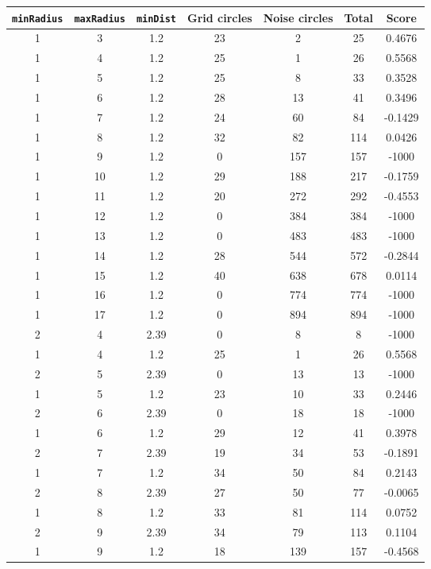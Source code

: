 \documentclass[letterpaper, 12pt]{article}
\begin{document}
\begin{longtable}{|c|c|c|c|c|c|c|}
\hline
\textbf{\texttt{minRadius}} & \textbf{\texttt{maxRadius}} & \textbf{\texttt{minDist}} & \textbf{Grid circles} & \textbf{Noise circles} & \textbf{Total} & \textbf{Score} \\
\hline
1 & 3 & 1.2 & 23 & 2 & 25 & 0.4676 \\
\hline
1 & 4 & 1.2 & 25 & 1 & 26 & 0.5568 \\
\hline
1 & 5 & 1.2 & 25 & 8 & 33 & 0.3528 \\
\hline
1 & 6 & 1.2 & 28 & 13 & 41 & 0.3496 \\
\hline
1 & 7 & 1.2 & 24 & 60 & 84 & -0.1429 \\
\hline
1 & 8 & 1.2 & 32 & 82 & 114 & 0.0426 \\
\hline
1 & 9 & 1.2 & 0 & 157 & 157 & -1000 \\
\hline
1 & 10 & 1.2 & 29 & 188 & 217 & -0.1759 \\
\hline
1 & 11 & 1.2 & 20 & 272 & 292 & -0.4553 \\
\hline
1 & 12 & 1.2 & 0 & 384 & 384 & -1000 \\
\hline
1 & 13 & 1.2 & 0 & 483 & 483 & -1000 \\
\hline
1 & 14 & 1.2 & 28 & 544 & 572 & -0.2844 \\
\hline
1 & 15 & 1.2 & 40 & 638 & 678 & 0.0114 \\
\hline
1 & 16 & 1.2 & 0 & 774 & 774 & -1000 \\
\hline
1 & 17 & 1.2 & 0 & 894 & 894 & -1000 \\
\hline
2 & 4 & 2.39 & 0 & 8 & 8 & -1000 \\
\hline
1 & 4 & 1.2 & 25 & 1 & 26 & 0.5568 \\
\hline
2 & 5 & 2.39 & 0 & 13 & 13 & -1000 \\
\hline
1 & 5 & 1.2 & 23 & 10 & 33 & 0.2446 \\
\hline
2 & 6 & 2.39 & 0 & 18 & 18 & -1000 \\
\hline
1 & 6 & 1.2 & 29 & 12 & 41 & 0.3978 \\
\hline
2 & 7 & 2.39 & 19 & 34 & 53 & -0.1891 \\
\hline
1 & 7 & 1.2 & 34 & 50 & 84 & 0.2143 \\
\hline
2 & 8 & 2.39 & 27 & 50 & 77 & -0.0065 \\
\hline
1 & 8 & 1.2 & 33 & 81 & 114 & 0.0752 \\
\hline
2 & 9 & 2.39 & 34 & 79 & 113 & 0.1104 \\
\hline
1 & 9 & 1.2 & 18 & 139 & 157 & -0.4568 \\

\end{longtable}
\end{document}
